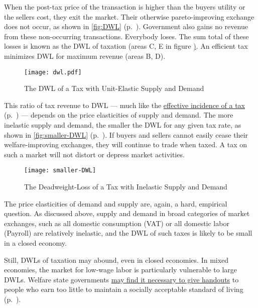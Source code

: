 When the post-tax price of the transaction is higher than the buyers utility or the sellers cost, they exit the market. Their otherwise pareto-improving exchange does not occur, as shown in \autoref{fig:DWL} (p.~\pageref{fig:DWL}). Government also gains no revenue from these non-occurring transactions. Everybody loses. The sum total of these losses is known as the \gls{DWL} of taxation (areas C, E in figure \href{fig:DWL}). An efficient tax minimizes \gls{DWL} for maximum revenue (areas B, D).

\begin{figure}[htbp]
	\centering
	\texttt{[image: dwl.pdf]}  
	\caption[Deadweight-Loss of a Tax with Unit-Elastic Supply and Demand]{The \gls{DWL} of a Tax with Unit-Elastic Supply and Demand}
	\label{fig:DWL}
\end{figure}

This ratio of tax revenue to \gls{DWL} --- much like the \hyperref[sec:well-determined-incidence]{effective incidence of a tax} (p.~\pageref{sec:well-determined-incidence}) --- depends on the price elasticities of supply and demand. The more inelastic supply and demand, the smaller the \gls{DWL} for any given tax rate, as shown in \autoref{fig:smaller-DWL} (p.~\pageref{fig:smaller-DWL}). If buyers and sellers cannot easily cease their welfare-improving exchanges, they will continue to trade when taxed. A tax on such a market will not distort or depress market activities.

\begin{figure}[htbp]
	\centering
	\texttt{[image: smaller-DWL]}  
	\caption[Deadweight-Loss of a Tax with Inelastic Suppy and Demand]{The Deadweight-Loss of a Tax with Inelastic Supply and Demand}
	\label{fig:smaller-DWL}
\end{figure}

The price elasticities of demand and supply are, again, a hard, empirical question. As discussed above, supply and demand in broad categories of market exchanges, such as all domestic consumption (\gls{VAT}) or all domestic labor (\gls{Payroll}) are relatively inelastic, and the \gls{DWL} of such taxes is likely to be small in a closed economy.

Still, \glspl{DWL} of taxation may abound, even in closed economies. In mixed economies, the market for low-wage labor is particularly vulnerable to large \gls{DWL}s. Welfare state governments  \hyperref[sec:distribution]{may find it necessary to give handouts} to people who earn too little to maintain a socially acceptable standard of living (p.~\pageref{sec:distribution}). 

